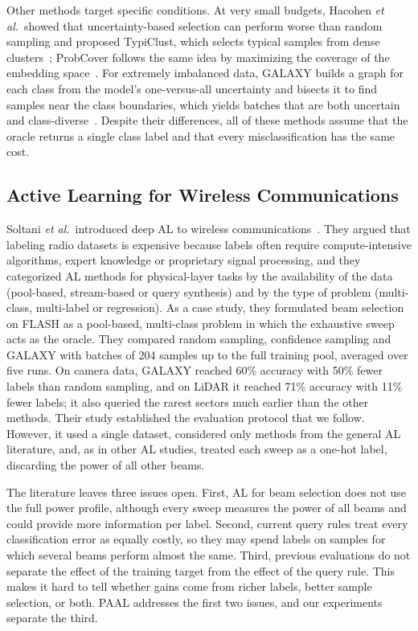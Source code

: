 \documentclass[journal,onecolumn]{IEEEtran}
\begin{document}
Other methods target specific conditions. At very small budgets, Hacohen \emph{et al.}\ showed that uncertainty-based selection can perform worse than random sampling and proposed TypiClust, which selects typical samples from dense clusters~\cite{hacohen2022typiclust}; ProbCover follows the same idea by maximizing the coverage of the embedding space~\cite{yehuda2022probcover}. For extremely imbalanced data, GALAXY builds a graph for each class from the model's one-versus-all uncertainty and bisects it to find samples near the class boundaries, which yields batches that are both uncertain and class-diverse~\cite{zhang2022galaxy}. Despite their differences, all of these methods assume that the oracle returns a single class label and that every misclassification has the same cost.

\subsection{Active Learning for Wireless Communications}
Soltani \emph{et al.}\ introduced deep AL to wireless communications~\cite{soltani2024learning}. They argued that labeling radio datasets is expensive because labels often require compute-intensive algorithms, expert knowledge or proprietary signal processing, and they categorized AL methods for physical-layer tasks by the availability of the data (pool-based, stream-based or query synthesis) and by the type of problem (multi-class, multi-label or regression). As a case study, they formulated beam selection on FLASH as a pool-based, multi-class problem in which the exhaustive sweep acts as the oracle. They compared random sampling, confidence sampling and GALAXY with batches of 204 samples up to the full training pool, averaged over five runs. On camera data, GALAXY reached 60\% accuracy with 50\% fewer labels than random sampling, and on LiDAR it reached 71\% accuracy with 11\% fewer labels; it also queried the rarest sectors much earlier than the other methods. Their study established the evaluation protocol that we follow. However, it used a single dataset, considered only methods from the general AL literature, and, as in other AL studies, treated each sweep as a one-hot label, discarding the power of all other beams.

The literature leaves three issues open. First, AL for beam selection does not use the full power profile, although every sweep measures the power of all beams and could provide more information per label. Second, current query rules treat every classification error as equally costly, so they may spend labels on samples for which several beams perform almost the same. Third, previous evaluations do not separate the effect of the training target from the effect of the query rule. This makes it hard to tell whether gains come from richer labels, better sample selection, or both. PAAL addresses the first two issues, and our experiments separate the third.
\end{document}
